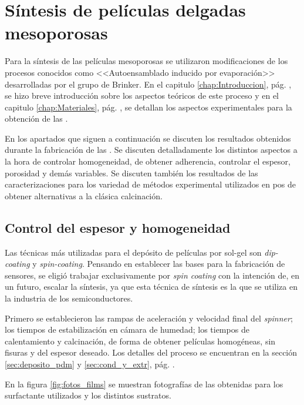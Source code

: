 \section{Síntesis de películas delgadas mesoporosas}
		
		Para la síntesis de las películas mesoporosas se utilizaron modificaciones de los procesos conocidos como <<Autoensamblado inducido por evaporación>> desarrolladas por el grupo de Brinker.\cite{Brinker1999} En el capitulo \ref{chap:Introduccion}, pág. \pageref{sec:mesoporosos}, se hizo breve introducción sobre los aspectos teóricos de este proceso y en el capitulo \ref{chap:Materiales}, pág. \pageref{sec:sintesis_mesoporosos}, se detallan los aspectos experimentales para la obtención de las \pdm.

		En los apartados que siguen a continuación se discuten los resultados obtenidos durante la fabricación de las \pdm. Se discuten detalladamente los distintos aspectos a la hora de controlar homogeneidad, de obtener adherencia, controlar el espesor, porosidad y demás variables. Se discuten también los resultados de las caracterizaciones para los variedad de métodos experimental utilizados en pos de obtener alternativas a la clásica calcinación.

	\subsection{Control del espesor y homogeneidad}
		
		Las técnicas más utilizadas para el depósito de películas por sol-gel son \textit{dip-coating} y \textit{spin-coating}. 
		Pensando en establecer las bases para la fabricación de sensores, se eligió trabajar exclusivamente por \textit{spin coating} con la intención de, en un futuro, escalar la síntesis, ya que esta técnica de síntesis es la que se utiliza en la industria de los semiconductores.\cite{Franssila2004,Jaeger2001}

		Primero se establecieron las rampas de aceleración y velocidad final del \textit{spinner}; los tiempos de estabilización en cámara de humedad; los tiempos de calentamiento y calcinación, de forma de obtener películas homogéneas, sin fisuras y del espesor deseado. Los detalles del proceso se encuentran en la sección \ref{sec:deposito_pdm} y \ref{sec:cond_y_extr}, pág. \pageref{sec:deposito_pdm}. 

		En la figura \ref{fig:fotos_films} se muestran fotografías de las \pdm\space obtenidas para los surfactante utilizados y los distintos sustratos. 

